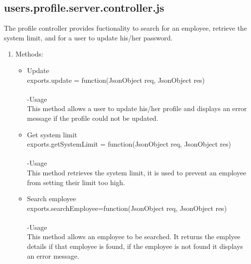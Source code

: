 \documentclass[a4paper,12pt]{article}
\begin{document}
\subsection{users.profile.server.controller.js}
 The profile controller provides fuctionality to search for an employee, retrieve the system limit, and for a user to update his/her password.
 \begin{enumerate}
 \item Methods:
 	\begin{itemize}
 		\item Update\\ 
 		exports.update = function(JsonObject req, JsonObject res)\\ \\ 
 		-Usage\\
 		This method allows a user to update his/her profile and displays an error message if the profile could not be updated. 
 		\item Get system limit\\ 
 		exports.getSystemLimit = function(JsonObject req, JsonObject res)\\ \\
 		-Usage\\
		 This method retrieves the system limit, it is used to prevent an employee from setting their limit too high.
 		\item Search employee\\
 		exports.searchEmployee=function(JsonObject req, JsonObject res)\\ \\ 
 		-Usage\\
		 This method allows an employee to be searched. It returns the emplyee details if that employee is found, if the employee is not found it displays an error message.
 	\end{itemize}
 \end{enumerate}
\end{document}
